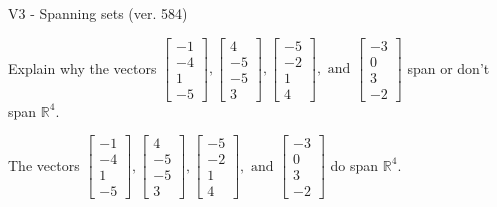 \begin{exercise}
  \begin{exerciseTitle}V3 - Spanning sets (ver. 584)\end{exerciseTitle}
  \begin{exerciseStatement}
    Explain why the vectors \(\left[\begin{array}{r}
-1 \\
-4 \\
1 \\
-5
\end{array}\right] , \left[\begin{array}{r}
4 \\
-5 \\
-5 \\
3
\end{array}\right] , \left[\begin{array}{r}
-5 \\
-2 \\
1 \\
4
\end{array}\right] , \text{ and } \left[\begin{array}{r}
-3 \\
0 \\
3 \\
-2
\end{array}\right]\) span or don't span \(\mathbb{R}^4\). 
	


  \end{exerciseStatement}
  \begin{exerciseAnswer}
   The vectors \(\left[\begin{array}{r}
-1 \\
-4 \\
1 \\
-5
\end{array}\right] , \left[\begin{array}{r}
4 \\
-5 \\
-5 \\
3
\end{array}\right] , \left[\begin{array}{r}
-5 \\
-2 \\
1 \\
4
\end{array}\right] , \text{ and } \left[\begin{array}{r}
-3 \\
0 \\
3 \\
-2
\end{array}\right]\) 
  	 do  
	span \(\mathbb{R}^4\).
  


  \end{exerciseAnswer}
\end{exercise}